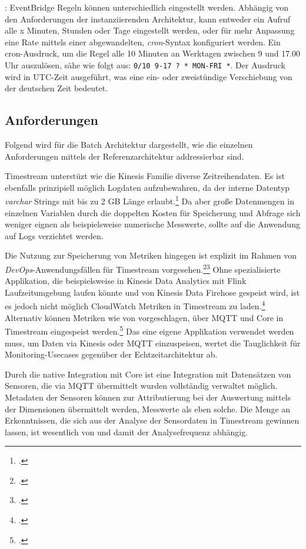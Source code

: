 : EventBridge Regeln können unterschiedlich eingestellt werden. Abhängig von den Anforderungen der instanziierenden Architektur, kann entweder ein Aufruf alle x Minuten, Stunden oder Tage eingestellt werden, oder für mehr Anpassung eine Rate mittels einer abgewandelten, \textit{cron}-Syntax konfiguriert werden. Ein cron-Ausdruck, um die Regel alle 10 Minuten an Werktagen zwischen 9 und 17.00 Uhr auszulösen, sähe wie folgt aus: \texttt{0/10 9-17 ? * MON-FRI *}. Der Ausdruck wird in \ac{UTC}-Zeit ausgeführt, was eine ein- oder zweistündige Verschiebung von der deutschen Zeit bedeutet.


\subsection{Anforderungen}
Folgend wird für die Batch Architektur dargestellt, wie die einzelnen Anforderungen mittels der Referenzarchitektur addressierbar sind.

Timestream unterstüzt wie die Kinesis Familie diverse Zeitreihendaten. Es ist ebenfalls prinzipiell möglich Logdaten aufzubewahren, da der interne Datentyp \textit{varchar} Strings mit bis zu 2 GB Länge erlaubt.\footcite[Vgl.][]{AmazonWebServicesInc..o.J.br} Da aber große Datenmengen in einzelnen Variablen durch die doppelten Kosten für Speicherung und Abfrage sich weniger eignen als beispielsweise numerische Messwerte, sollte auf die Anwendung auf Logs verzichtet werden.

Die Nutzung zur Speicherung von Metriken hingegen ist explizit im Rahmen von \textit{DevOps}-Anwendungsfällen für Timestream vorgesehen.\footcite[Vgl.][]{AmazonWebServicesInc..o.J.ak}\nzitat\footcite[Vgl.][]{Das.2020} Ohne spezialisierte Applikation, die beispielsweise in Kinesis Data Analytics mit Flink Laufzeitumgebung laufen könnte und von Kinesis Data Firehose gespeist wird, ist es jedoch nicht möglich CloudWatch Metriken in Timestream zu laden.\footcite[Vgl.][]{Riddle.2021} Alternativ können Metriken wie von \citeauthor{Pochiraju.2020} vorgeschlagen, über \ac{MQTT} und \AWSIOT{} Core in Timestream eingespeist werden.\footcite[Vgl.][]{Pochiraju.2020} Das eine eigene Applikation verwendet werden muss, um Daten via Kinesis oder \ac{MQTT} einzuspeisen, wertet die Tauglichkeit für Monitoring-Usecases gegenüber der Echtzeitarchitektur ab.


Durch die native Integration mit \AWSIOT{} Core ist eine Integration mit Datensätzen von Sensoren, die via \ac{MQTT} übermittelt wurden vollständig verwaltet möglich. Metadaten der Sensoren können zur Attributierung bei der Auswertung mittels der Dimensionen übermittelt werden, Messwerte als eben solche. Die Menge an Erkenntnissen, die sich aus der Analyse der Sensordaten in Timestream gewinnen lassen, ist wesentlich von  und damit der Analysefrequenz abhängig.

